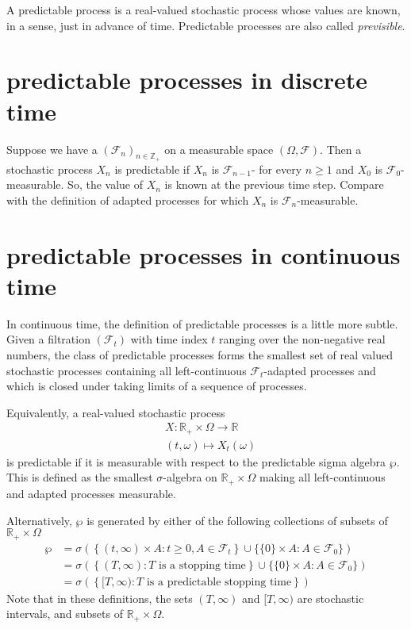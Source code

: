 \documentclass[12pt]{article}
\begin{document}
A predictable process is a real-valued stochastic process whose values are known, in a sense, just in advance of time. Predictable processes are also called \emph{previsible}.

\section{predictable processes in discrete time}

Suppose we have a  $(\mathcal{F}_n)_{n\in\mathbb{Z}_+}$ on a measurable space $(\Omega,\mathcal{F})$. Then a stochastic process $X_n$ is predictable if $X_n$ is $\mathcal{F}_{n-1}$- for every $n\ge 1$ and $X_0$ is $\mathcal{F}_0$-measurable. So, the value of $X_n$ is known at the previous time step. Compare with the definition of adapted processes for which $X_n$ is $\mathcal{F}_n$-measurable.

\section{predictable processes in continuous time}

In continuous time, the definition of predictable processes is a little more subtle. Given a filtration $(\mathcal{F}_t)$ with time index $t$ ranging over the non-negative real numbers, the class of predictable processes forms the smallest set of real valued stochastic processes containing all left-continuous $\mathcal{F}_t$-adapted processes and which is closed under taking limits of a sequence of processes.

Equivalently, a real-valued stochastic process
\begin{align*}
&X\colon\mathbb{R}_+\times\Omega\rightarrow\mathbb{R}\\
&(t,\omega)\mapsto X_t(\omega)
\end{align*}
is predictable if it is measurable with respect to the predictable sigma algebra $\wp$. This is defined as the smallest $\sigma$-algebra on $\mathbb{R}_+\times\Omega$ making all left-continuous and adapted processes measurable.

Alternatively, $\wp$ is generated by either of the following collections of subsets of $\mathbb{R}_+\times\Omega$
\begin{align*}
\wp &=\sigma\left(\left\{(t,\infty)\times A:t\ge 0,A\in\mathcal{F}_t\right\}\cup\{\{0\}\times A:A\in\mathcal{F}_0\}\right)\\
&=\sigma\left(\left\{(T,\infty):T\textrm{ is a stopping time}\right\}\cup\{\{0\}\times A:A\in\mathcal{F}_0\}\right)\\
&=\sigma\left(\left\{[T,\infty):T\textrm{ is a predictable stopping time}\right\}\right)
\end{align*}
Note that in these definitions, the sets $(T,\infty)$ and $[T,\infty)$ are stochastic intervals, and subsets of $\mathbb{R}_+\times\Omega$.
\end{document}
